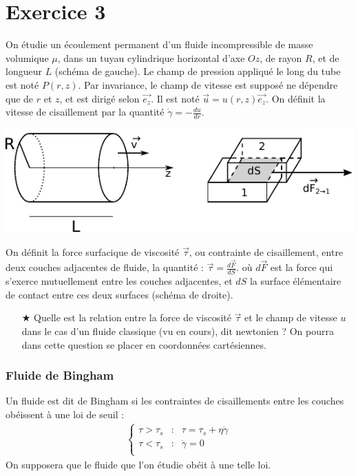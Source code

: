 \documentclass{report}
\begin{document}
\newpage

\section*{Exercice 3}

On étudie un écoulement permanent d'un fluide incompressible de masse volumique $\mu$, dans un tuyau cylindrique horizontal d'axe $Oz$, de rayon $R$, et de longueur $L$ (schéma de gauche). Le champ de pression appliqué le long du tube est noté $P(r,z)$. Par invariance, le champ de vitesse est supposé ne dépendre que de $r$ et $z$, et est dirigé selon $\vec{e_z}$. Il est noté $\vec{u}=u(r,z)\vec{e_z}$. On définit la vitesse de cisaillement par la quantité $\dot{\gamma}=-\frac{du}{dr}$. 

\begin{center}
	\includegraphics[scale=0.8]{meca_flu2.pdf}
\end{center}

On définit la force surfacique de viscosité $\vec{\tau}$, ou contrainte de cisaillement, entre deux couches adjacentes de fluide, la quantité : $\vec{\tau}=\frac{d\vec{F}}{dS}$.
où $d\vec{F}$ est la force qui s'exerce mutuellement entre les couches adjacentes, et $dS$ la surface élémentaire de contact entre ces deux surfaces (schéma de droite).

\begin{itemize}
	\item[$\bigstar$] Quelle est la relation entre la force de viscosité $\vec{\tau}$ et le champ de vitesse $u$ dans le cas d'un fluide classique (vu en cours), dit newtonien ? On pourra dans cette question se placer en coordonnées cartésiennes.
	
\end{itemize}

\subsubsection*{Fluide de Bingham}

Un fluide est dit de Bingham si les contraintes de cisaillements entre les couches obéissent à une loi de seuil : 
\begin{align*}
	\left\lbrace
\begin{array}{ccc}
\tau>\tau_s & : & \tau = \tau_s+\eta\dot{\gamma} \\
\tau<\tau_s & : & \dot{\gamma}=0\\
\end{array}\right.
\end{align*}
On supposera que le fluide que l'on étudie obéit à une telle loi. 
\end{document}
